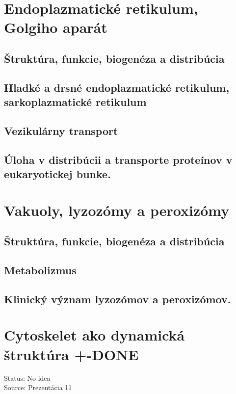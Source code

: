\section{Endoplazmatické retikulum, Golgiho aparát}

\subsection{Štruktúra, funkcie, biogenéza a distribúcia}

\subsection{Hladké a drsné endoplazmatické retikulum, sarkoplazmatické retikulum}

\subsection{Vezikulárny transport}

\subsection{Úloha v distribúcii a transporte proteínov v eukaryotickej bunke.}

\section{Vakuoly, lyzozómy a peroxizómy}

\subsection{Štruktúra, funkcie, biogenéza a distribúcia}

\subsection{Metabolizmus}

\subsection{Klinický význam lyzozómov a peroxizómov. }

\section{Cytoskelet ako dynamická štruktúra +-DONE}

Status: No idea\\
Source: Prezentácia 11\\

